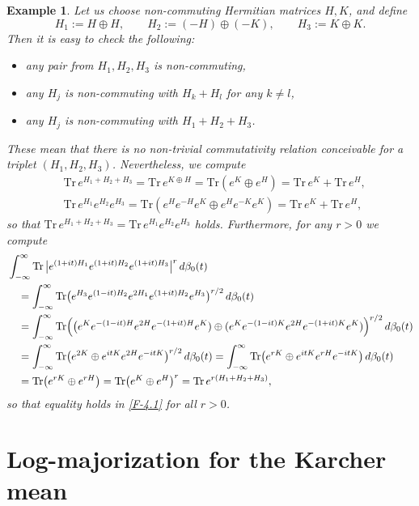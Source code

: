 \documentclass[11pt,reqno]{article}
\newtheorem{example}[theorem]{Example}
\numberwithin{equation}{section}
\def\Tr{\mathrm{Tr}}
\begin{document}
\begin{example}\label{E-4.1}\rm
Let us choose non-commuting Hermitian matrices $H,K$, and define
\[
H_1:=H\oplus H,\qquad H_2:=(-H)\oplus(-K),\qquad H_3:=K\oplus K.
\]
Then it is easy to check the following:
\begin{itemize}
\item any pair from $H_1,H_2,H_3$ is non-commuting,
\item any $H_j$ is non-commuting with $H_k+H_l$ for any $k\ne l$,
\item any $H_j$ is non-commuting with $H_1+H_2+H_3$.
\end{itemize}
These mean that there is no non-trivial commutativity relation conceivable for a triplet $(H_1,H_2,H_3)$.
Nevertheless, we compute
\begin{align*}
&\Tr\,e^{H_1+H_2+H_3}=\Tr\,e^{K\oplus H}=\Tr(e^K\oplus e^H)=\Tr\,e^K+\Tr\,e^H, \\
&\Tr\,e^{H_1}e^{H_2}e^{H_3}=\Tr(e^He^{-H}e^K\oplus e^He^{-K}e^K)=\Tr\,e^K+\Tr\,e^H,
\end{align*}
so that $\Tr\,e^{H_1+H_2+H_3}=\Tr\,e^{H_1}e^{H_2}e^{H_3}$ holds. Furthermore, for any $r>0$ we compute
\begin{align*}
&\int_{-\infty}^\infty\Tr\,\big|e^{(1+it)H_1}e^{(1+it)H_2}e^{(1+it)H_3}\big|^r\,d\beta_0(t) \\
&\quad=\int_{-\infty}^\infty\Tr\bigl(e^{H_3}e^{(1-it)H_2}e^{2H_1}
e^{(1+it)H_2}e^{H_3}\bigr)^{r/2}\,d\beta_0(t) \\
&\quad=\int_{-\infty}^\infty\Tr\Bigl(\bigl(e^Ke^{-(1-it)H}e^{2H}e^{-(1+it)H}e^K)
\oplus(e^Ke^{-(1-it)K}e^{2H}e^{-(1+it)K}e^K)\Bigr)^{r/2}\,d\beta_0(t) \\
&\quad=\int_{-\infty}^\infty\Tr\bigl(e^{2K}\oplus e^{itK}e^{2H}e^{-itK}\bigr)^{r/2}\,d\beta_0(t)
=\int_{-\infty}^\infty\Tr\bigl(e^{rK}\oplus e^{itK}e^{rH}e^{-itK}\bigr)\,d\beta_0(t) \\
&\quad=\Tr\bigl(e^{rK}\oplus e^{rH}\bigr)=\Tr\bigl(e^K\oplus e^H\bigr)^r
=\Tr\,e^{r(H_1+H_2+H_3)},
\end{align*}
so that equality holds in \eqref{F-4.1} for all $r>0$.
\end{example}

\section{Log-majorization for the Karcher mean}\label{Sec-5}
\end{document}

